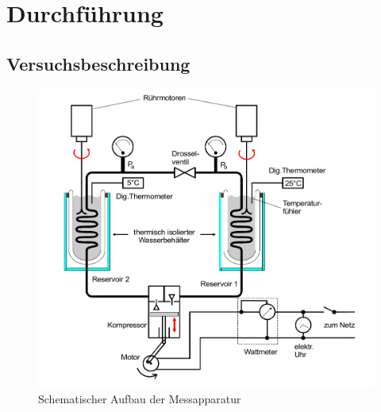 \section{Durchführung}
\label{sec:Durchführung}


\subsection{Versuchsbeschreibung}
\label{sec:Versuchsbeschreibung}
\begin{figure}
  \centering
  \includegraphics[width=\textwidth]{content/messapparatur.png}
  \caption{Schematischer Aufbau der Messapparatur \cite{Anleitung}}
  \label{fig:bild2}
\end{figure}
